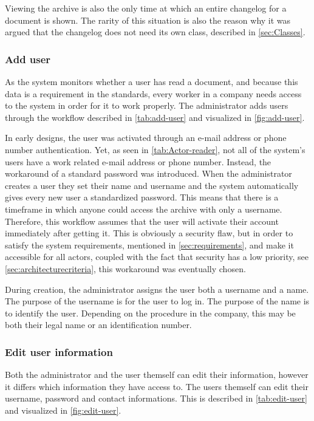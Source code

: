 Viewing the archive is also the only time at which an entire changelog for a document is shown.
The rarity of this situation is also the reason why it was argued that the changelog does not need its own class, described in \cref{sec:Classes}.

\subsubsection{Add user}
As the system monitors whether a user has read a document, and because this data is a requirement in the standards, every worker in a company needs access to the system in order for it to work properly.
The administrator adds users through the workflow described in \cref{tab:add-user} and visualized in \cref{fig:add-user}.




In early designs, the user was activated through an e-mail address or phone number authentication.
Yet, as seen in \cref{tab:Actor-reader}, not all of the system's users have a work related e-mail address or phone number.
Instead, the workaround of a standard password was introduced.
When the administrator creates a user they set their name and username and the system automatically gives every new user a standardized password.
This means that there is a timeframe in which anyone could access the archive with only a username. %
Therefore, this workflow assumes that the user will activate their account immediately after getting it. %
This is obviously a security flaw, but in order to satisfy the system requirements, mentioned in \cref{sec:requirements}, and make it accessible for all actors, coupled with the fact that security has a low priority, see \cref{sec:architecturecriteria}, this workaround was eventually chosen.

During creation, the administrator assigns the user both a username and a name.
The purpose of the username is for the user to log in.
The purpose of the name is to identify the user.
Depending on the procedure in the company, this may be both their legal name or an identification number.

\subsubsection{Edit user information}
Both the administrator and the user themself can edit their information, however it differs which information they have access to.
The users themself can edit their username, password and contact informations.
This is described in \cref{tab:edit-user} and visualized in \cref{fig:edit-user}.

